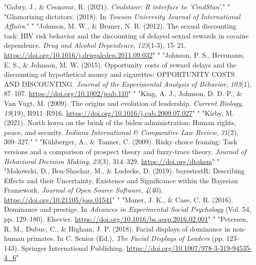 \documentclass[
"  donotrepeattitle,doc, 12pt, a4paper,floatsintext]{apa7}"
\begin{document}
\begin{CSLReferences}{1}{0}
"Gabry, J., \& Cesnovar, R. (2021). \emph{Cmdstanr: {R} interface to '{CmdStan}'}."
"\leavevmode{}%
"Glamorizing dictators. (2018). In \emph{Towson University Journal of International Affairs}."
"\leavevmode{}%
"Johnson, M. W., \& Bruner, N. R. (2012). The sexual discounting task: {HIV} risk behavior and the discounting of delayed sexual rewards in cocaine dependence. \emph{Drug and Alcohol Dependence}, \emph{123}(1-3), 15--21. \url{https://doi.org/10.1016/j.drugalcdep.2011.09.032}"
"\leavevmode{}%
"Johnson, P. S., Herrmann, E. S., \& Johnson, M. W. (2015). Opportunity costs of reward delays and the discounting of hypothetical money and cigarettes: {OPPORTUNITY COSTS AND DISCOUNTING}. \emph{Journal of the Experimental Analysis of Behavior}, \emph{103}(1), 87--107. \url{https://doi.org/10.1002/jeab.110}"
"\leavevmode{}%
"King, A. J., Johnson, D. D. P., \& Van Vugt, M. (2009). The origins and evolution of leadership. \emph{Current Biology}, \emph{19}(19), R911--R916. \url{https://doi.org/10.1016/j.cub.2009.07.027}"
"\leavevmode{}%
"Kirby, M. (2021). North korea on the brink of the biden administration: Human rights, peace, and security. \emph{Indiana International \& Comparative Law Review}, \emph{31}(2), 309--327."
"\leavevmode{}%
"Kühberger, A., \& Tanner, C. (2009). Risky choice framing: Task versions and a comparison of prospect theory and fuzzy-trace theory. \emph{Journal of Behavioral Decision Making}, \emph{23}(3), 314--329. \url{https://doi.org/dtqksm}"
"\leavevmode{}%
"Makowski, D., Ben-Shachar, M., \& Ludecke, D. (2019). {bayestestR}: {Describing Effects} and their {Uncertainty}, {Existence} and {Significance} within the {Bayesian Framework}. \emph{Journal of Open Source Software}, \emph{4}(40). \url{https://doi.org/10.21105/joss.01541}"
"\leavevmode{}%
"Maner, J. K., \& Case, C. R. (2016). Dominance and prestige. In \emph{Advances in {Experimental Social Psychology}} (Vol. 54, pp. 129--180). {Elsevier}. \url{https://doi.org/10.1016/bs.aesp.2016.02.001}"
"\leavevmode{}%
"Petersen, R. M., Dubuc, C., \& Higham, J. P. (2018). Facial displays of dominance in non-human primates. In C. Senior (Ed.), \emph{The {Facial Displays} of {Leaders}} (pp. 123--143). {Springer International Publishing}. \url{https://doi.org/10.1007/978-3-319-94535-4_6}"

\end{CSLReferences}
\end{document}
